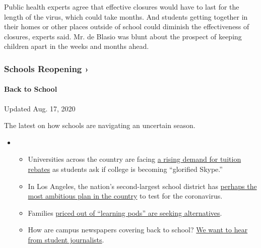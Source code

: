 Public health experts agree that effective closures would have to last
for the length of the virus, which could take months. And students
getting together in their homes or other places outside of school could
diminish the effectiveness of closures, experts said. Mr. de Blasio was
blunt about the prospect of keeping children apart in the weeks and
months ahead.

\href{https://www.nytimes3xbfgragh.onion/spotlight/schools-reopening?action=click\&pgtype=Article\&state=default\&region=MAIN_CONTENT_3\&context=storylines_keepup}{}

\hypertarget{schools-reopening-}{%
\subsubsection{Schools Reopening ›}\label{schools-reopening-}}

\hypertarget{back-to-school}{%
\paragraph{Back to School}\label{back-to-school}}

Updated Aug. 17, 2020

The latest on how schools are navigating an uncertain season.

\begin{itemize}
\item
  \begin{itemize}
  \tightlist
  \item
    Universities across the country are facing
    \href{https://www.nytimes3xbfgragh.onion/2020/08/15/us/covid-college-tuition.html?action=click\&pgtype=Article\&state=default\&region=MAIN_CONTENT_3\&context=storylines_keepup}{a
    rising demand for tuition rebates} as students ask if college is
    becoming ``glorified Skype.''
  \item
    In Los Angeles, the nation's second-largest school district has
    \href{https://www.nytimes3xbfgragh.onion/2020/08/16/us/los-angeles-schools-virus-testing.html?action=click\&pgtype=Article\&state=default\&region=MAIN_CONTENT_3\&context=storylines_keepup}{perhaps
    the most ambitious plan in the country} to test for the coronavirus.
  \item
    Families
    \href{https://www.nytimes3xbfgragh.onion/2020/08/14/us/covid-schools-learning-pods.html?action=click\&pgtype=Article\&state=default\&region=MAIN_CONTENT_3\&context=storylines_keepup}{priced
    out of ``learning pods'' are seeking alternatives}.
  \item
    How are campus newspapers covering back to school?
    \href{https://www.nytimes3xbfgragh.onion/2020/08/17/us/student-newspaper-schools-reopening.html?action=click\&pgtype=Article\&state=default\&region=MAIN_CONTENT_3\&context=storylines_keepup}{We
    want to hear from student journalists}.
  \end{itemize}
\end{itemize}

